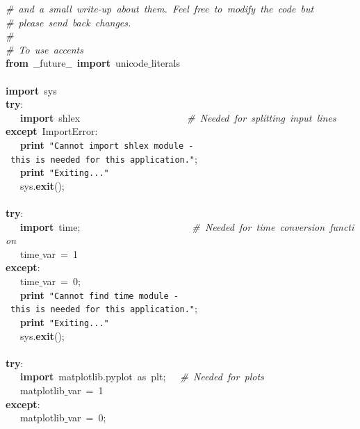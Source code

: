 \mbox{}\textit{\#\ and\ a\ small\ write-up\ about\ them.\ Feel\ free\ to\ modify\ the\ code\ but} \\
\mbox{}\textit{\#\ please\ send\ back\ changes.} \\
\mbox{}\textit{\#} \\
\mbox{}\textit{\#\ To\ use\ accents} \\
\mbox{}\textbf{from}\ $\_$$\_$future$\_$$\_$\ \textbf{import}\ unicode$\_$literals \\
\mbox{} \\
\mbox{}\textbf{import}\ sys \\
\mbox{}\textbf{try}: \\
\mbox{}\ \ \ \textbf{import}\ shlex\ \ \ \ \ \ \ \ \ \ \ \ \ \ \ \ \ \ \ \ \ \ \textit{\#\ Needed\ for\ splitting\ input\ lines} \\
\mbox{}\textbf{except}\ ImportError: \\
\mbox{}\ \ \ \textbf{print}\ \texttt{"{}Cannot\ import\ shlex\ module\ -\ this\ is\ needed\ for\ this\ application."{}}; \\
\mbox{}\ \ \ \textbf{print}\ \texttt{"{}Exiting..."{}} \\
\mbox{}\ \ \ sys.\textbf{exit}(); \\
\mbox{} \\
\mbox{}\textbf{try}: \\
\mbox{}\ \ \ \textbf{import}\ time;\ \ \ \ \ \ \ \ \ \ \ \ \ \ \ \ \ \ \ \ \ \ \ \textit{\#\ Needed\ for\ time\ conversion\ function} \\
\mbox{}\ \ \ time$\_$var\ =\ 1 \\
\mbox{}\textbf{except}: \\
\mbox{}\ \ \ time$\_$var\ =\ 0; \\
\mbox{}\ \ \ \textbf{print}\ \texttt{"{}Cannot\ find\ time\ module\ -\ this\ is\ needed\ for\ this\ application."{}}; \\
\mbox{}\ \ \ \textbf{print}\ \texttt{"{}Exiting..."{}} \\
\mbox{}\ \ \ sys.\textbf{exit}(); \\
\mbox{} \\
\mbox{}\textbf{try}: \\
\mbox{}\ \ \ \textbf{import}\ matplotlib.pyplot\ as\ plt;\ \ \ \textit{\#\ Needed\ for\ plots} \\
\mbox{}\ \ \ matplotlib$\_$var\ =\ 1 \\
\mbox{}\textbf{except}: \\
\mbox{}\ \ \ matplotlib$\_$var\ =\ 0; \\
